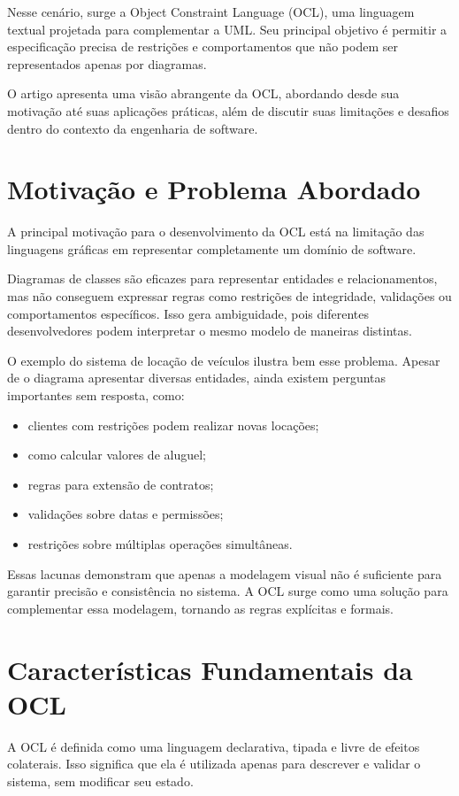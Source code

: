 \documentclass[conference]{IEEEtran}
\begin{document}
Nesse cenário, surge a Object Constraint Language (OCL), uma linguagem textual projetada para complementar a UML. Seu principal objetivo é permitir a especificação precisa de restrições e comportamentos que não podem ser representados apenas por diagramas.

O artigo apresenta uma visão abrangente da OCL, abordando desde sua motivação até suas aplicações práticas, além de discutir suas limitações e desafios dentro do contexto da engenharia de software.

\section{Motivação e Problema Abordado}

A principal motivação para o desenvolvimento da OCL está na limitação das linguagens gráficas em representar completamente um domínio de software.

Diagramas de classes são eficazes para representar entidades e relacionamentos, mas não conseguem expressar regras como restrições de integridade, validações ou comportamentos específicos. Isso gera ambiguidade, pois diferentes desenvolvedores podem interpretar o mesmo modelo de maneiras distintas.

O exemplo do sistema de locação de veículos ilustra bem esse problema. Apesar de o diagrama apresentar diversas entidades, ainda existem perguntas importantes sem resposta, como:
\begin{itemize}
\item clientes com restrições podem realizar novas locações;
\item como calcular valores de aluguel;
\item regras para extensão de contratos;
\item validações sobre datas e permissões;
\item restrições sobre múltiplas operações simultâneas.
\end{itemize}

Essas lacunas demonstram que apenas a modelagem visual não é suficiente para garantir precisão e consistência no sistema. A OCL surge como uma solução para complementar essa modelagem, tornando as regras explícitas e formais.

\section{Características Fundamentais da OCL}

A OCL é definida como uma linguagem declarativa, tipada e livre de efeitos colaterais. Isso significa que ela é utilizada apenas para descrever e validar o sistema, sem modificar seu estado.
\end{document}
